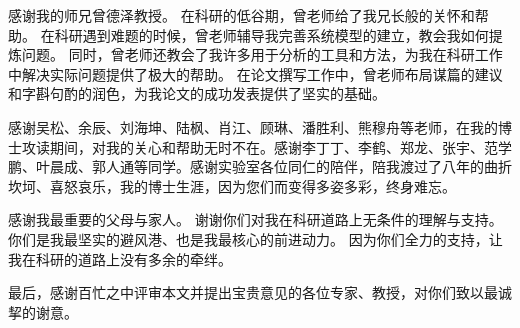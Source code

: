 \documentclass[format=draft,language=chinese,degree=phd,table,usenames,dvipsnames]{hustthesis}
\begin{document}
\begin{ack}

感谢我的师兄曾德泽教授。
在科研的低谷期，曾老师给了我兄长般的关怀和帮助。
在科研遇到难题的时候，曾老师辅导我完善系统模型的建立，教会我如何提炼问题。
同时，曾老师还教会了我许多用于分析的工具和方法，为我在科研工作中解决实际问题提供了极大的帮助。
在论文撰写工作中，曾老师布局谋篇的建议和字斟句酌的润色，为我论文的成功发表提供了坚实的基础。


感谢吴松、余辰、刘海坤、陆枫、肖江、顾琳、潘胜利、熊穆舟等老师，在我的博士攻读期间，对我的关心和帮助无时不在。感谢李丁丁、李鹤、郑龙、张宇、范学鹏、叶晨成、郭人通等同学。感谢实验室各位同仁的陪伴，陪我渡过了八年的曲折坎坷、喜怒哀乐，我的博士生涯，因为您们而变得多姿多彩，终身难忘。

感谢我最重要的父母与家人。
谢谢你们对我在科研道路上无条件的理解与支持。
你们是我最坚实的避风港、也是我最核心的前进动力。
因为你们全力的支持，让我在科研的道路上没有多余的牵绊。

最后，感谢百忙之中评审本文并提出宝贵意见的各位专家、教授，对你们致以最诚挈的谢意。


\end{ack}



\appendix
\end{document}

